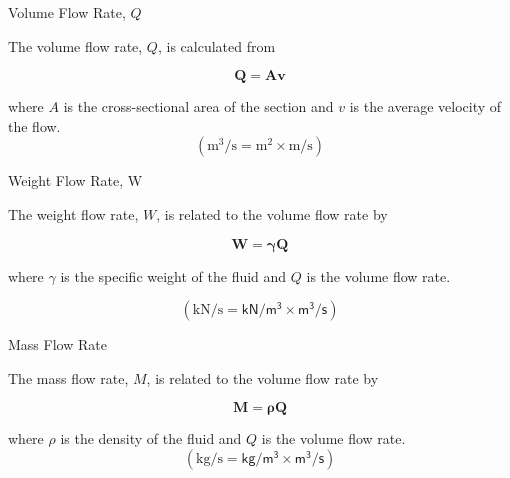 \documentclass[9pt,xcolor={svgnames, x11names},professionalfonts, mathserif]{beamer}
\begin{document}
\begin{frame}{Volume Flow Rate, $Q$}
	\begin{center}
		\begin{minipage}{0.65\textwidth}
			\raggedright
			The volume flow rate, $Q$, is calculated from
			\begin{center}
				\begin{mybox}	[width=3cm]
					\vspace{-0.5cm}
					\[\bm{ Q=Av }\]
				\end{mybox}
			\end{center}
			where $A$ is the cross-sectional area of the section and $v$ is the average velocity of the flow.
			\[ \left(\text{m}^3/\text{s} = \text{m}^2\times\text{m/s}\right) \]
			
		\end{minipage}
	\end{center}
\end{frame}


\begin{frame}{Weight Flow Rate, W}
	\begin{center}
		\begin{minipage}{0.65\textwidth}
			The weight flow rate, $W$, is related to the volume flow rate by
			\begin{center}
				\begin{mybox}[width=3cm]
					\vspace{-0.5cm}
					\[\bm{ W=\gamma Q } \]
				\end{mybox}
			\end{center}
			where $\gamma$ is the specific weight of the fluid  and $Q$ is the volume flow rate.
			
			\[ \left(\text{kN/s} = \mathsf{kN/m^3}\times\mathsf{m^3/s}\right) \]
			
		\end{minipage}
	\end{center}
\end{frame}


\begin{frame}{Mass Flow Rate}
	\begin{center}
		\begin{minipage}{0.65\textwidth}
			\raggedright
			The mass flow rate, $M$, is related to the volume flow rate by
			\begin{center}
				\begin{mybox}[width=3cm]
					\vspace{-0.5cm}
					\[\bm{ M=\rho Q } \]
				\end{mybox}
			\end{center}
			where $\rho$ is the density of the fluid and $Q$ is the volume flow rate.
			\[ \left(\text{kg/s} = \mathsf{kg/m^3}\times\mathsf{m^3/s}\right) \]
		\end{minipage}
	\end{center}
\end{frame}
\end{document}
